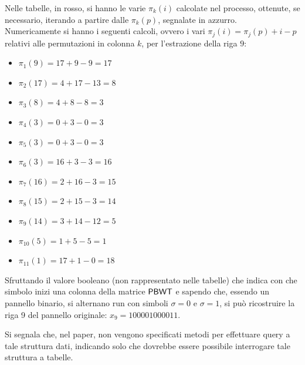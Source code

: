 \begin{esempio}
\begin{figure}[H]
  \end{figure}
  Nelle tabelle, in rosso, si hanno le varie $\pi_k(i)$ calcolate nel processo,
  ottenute, 
  se necessario, iterando a partire dalle $\pi_k(p)$, segnalate in azzurro. \\
  Numericamente si hanno i seguenti calcoli, ovvero i vari
  $\pi_j(i)=\pi_j(p)+i-p$
  relativi alle permutazioni in colonna $k$, per l'estrazione della riga $9$:
  \begin{multicols}{2}
    \begin{itemize}
      \item $\pi_1(9)=17+9-9=17$
      \item $\pi_2(17)=4+17-13=8$
      \item $\pi_3(8)=4+8-8=3$
      \item $\pi_4(3)=0+3-0=3$
      \item $\pi_5(3)=0+3-0=3$
      \item $\pi_6(3)=16+3-3=16$
      \item $\pi_7(16)=2+16-3=15$
      \item $\pi_8(15)=2+15-3=14$
      \item $\pi_9(14)=3+14-12=5$
      \item $\pi_{10}(5)=1+5-5=1$
      \item $\pi_{11}(1)=17+1-0=18$
    \end{itemize}
  \end{multicols}
  Sfruttando il valore booleano (non rappresentato nelle tabelle) che indica con
  che simbolo inizi una colonna 
  della matrice $\mbox{\rm {\sf PBWT}}$ e
  sapendo che, 
  essendo un pannello binario, si alternano run con simboli $\sigma=0$ e
  $\sigma=1$, si può ricostruire la riga 9 del pannello originale:
  $x_9=100001000011$.
\end{esempio}
Si segnala che, nel paper, non vengono specificati metodi per
effettuare query a 
tale struttura dati, indicando solo che dovrebbe essere possibile interrogare
tale struttura a tabelle.
